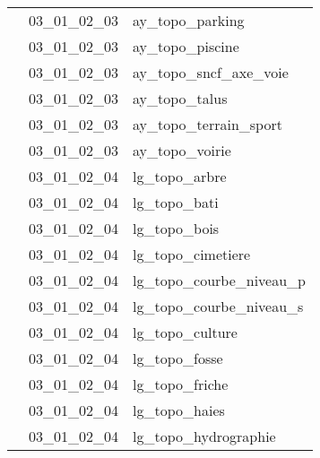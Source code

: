 \documentclass[12pt,titlepage,oneside]{book}
\begin{document}
\begin{supertabular}{|p{10cm}|c|p{15cm}|}
                    & 03\_01\_02\_03 & ay\_topo\_parking\\


                    & 03\_01\_02\_03 & ay\_topo\_piscine\\


                    & 03\_01\_02\_03 & ay\_topo\_sncf\_axe\_voie\\


                    & 03\_01\_02\_03 & ay\_topo\_talus\\


                    & 03\_01\_02\_03 & ay\_topo\_terrain\_sport\\


                    & 03\_01\_02\_03 & ay\_topo\_voirie\\


                    & 03\_01\_02\_04 & lg\_topo\_arbre\\


                    & 03\_01\_02\_04 & lg\_topo\_bati\\


                    & 03\_01\_02\_04 & lg\_topo\_bois\\


                    & 03\_01\_02\_04 & lg\_topo\_cimetiere\\


                    & 03\_01\_02\_04 & lg\_topo\_courbe\_niveau\_p\\


                    & 03\_01\_02\_04 & lg\_topo\_courbe\_niveau\_s\\


                    & 03\_01\_02\_04 & lg\_topo\_culture\\


                    & 03\_01\_02\_04 & lg\_topo\_fosse\\


                    & 03\_01\_02\_04 & lg\_topo\_friche\\


                    & 03\_01\_02\_04 & lg\_topo\_haies\\


                    & 03\_01\_02\_04 & lg\_topo\_hydrographie\\



\end{supertabular}
\end{document}
